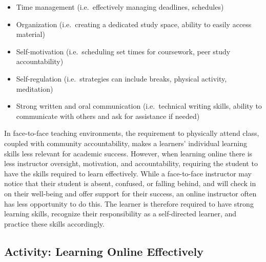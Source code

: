 \documentclass[
]{book}
\providecommand{\tightlist}{%
  \setlength{\itemsep}{0pt}\setlength{\parskip}{0pt}}
\theoremstyle{definition}
\theoremstyle{definition}
\theoremstyle{definition}
\theoremstyle{definition}
\theoremstyle{remark}
\begin{document}
\begin{itemize}
\tightlist
\item
  Time management (i.e.~effectively managing deadlines, schedules)\\
\item
  Organization (i.e.~creating a dedicated study space, ability to easily access material)\\
\item
  Self-motivation (i.e.~scheduling set times for coursework, peer study accountability)\\
\item
  Self-regulation (i.e.~strategies can include breaks, physical activity, meditation)\\
\item
  Strong written and oral communication (i.e.~technical writing skills, ability to communicate with others and ask for assistance if needed)
\end{itemize}

In face-to-face teaching environments, the requirement to physically attend class, coupled with community accountability, makes a learners' individual learning skills less relevant for academic success. However, when learning online there is less instructor oversight, motivation, and accountability, requiring the student to have the skills required to learn effectively. While a face-to-face instructor may notice that their student is absent, confused, or falling behind, and will check in on their well-being and offer support for their success, an online instructor often has less opportunity to do this. The learner is therefore required to have strong learning skills, recognize their responsibility as a self-directed learner, and practice these skills accordingly.

\hypertarget{activity-learning-online-effectively}{%
\subsection*{Activity: Learning Online Effectively}\label{activity-learning-online-effectively}}
\end{document}
